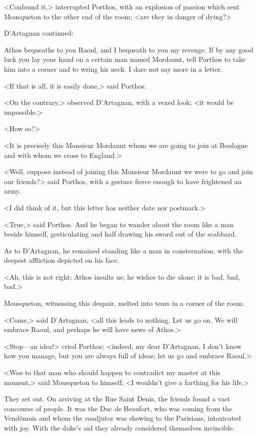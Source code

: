 <Confound it,> interrupted Porthos, with an explosion of passion which sent Mousqueton to the other end of the room; <are they in danger of dying?>

D'Artagnan continued:

\begin{mail}{}{}
Athos bequeaths to you Raoul, and I bequeath to you my revenge. If by any good luck you lay your hand on a certain man named Mordaunt, tell Porthos to take him into a corner and to wring his neck. I dare not say more in a letter.
\end{mail}

<If that is all, it is easily done,> said Porthos.

<On the contrary,> observed D'Artagnan, with a vexed look; <it would be impossible.>

<How so?>

<It is precisely this Monsieur Mordaunt whom we are going to join at Boulogne and with whom we cross to England.>

<Well, suppose instead of joining this Monsieur Mordaunt we were to go and join our friends?> said Porthos, with a gesture fierce enough to have frightened an army.

<I did think of it, but this letter has neither date nor postmark.>

<True,> said Porthos. And he began to wander about the room like a man beside himself, gesticulating and half drawing his sword out of the scabbard.

As to D'Artagnan, he remained standing like a man in consternation, with the deepest affliction depicted on his face.

<Ah, this is not right; Athos insults us; he wishes to die alone; it is bad, bad, bad.>

Mousqueton, witnessing this despair, melted into tears in a corner of the room.

<Come,> said D'Artagnan, <all this leads to nothing. Let us go on. We will embrace Raoul, and perhaps he will have news of Athos.>

<Stop—an idea!> cried Porthos; <indeed, my dear D'Artagnan, I don't know how you manage, but you are always full of ideas; let us go and embrace Raoul.>

<Woe to that man who should happen to contradict my master at this moment,> said Mousqueton to himself; <I wouldn't give a farthing for his life.>

They set out. On arriving at the Rue Saint Denis, the friends found a vast concourse of people. It was the Duc de Beaufort, who was coming from the Vendômois and whom the coadjutor was showing to the Parisians, intoxicated with joy. With the duke's aid they already considered themselves invincible.

